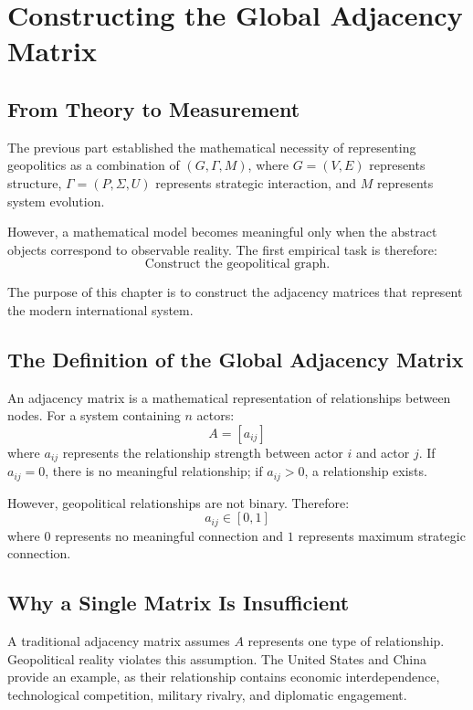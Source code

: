 \documentclass[11pt,openany]{book}
\theoremstyle{plain}
\theoremstyle{definition}
\begin{document}
\chapter{Constructing the Global Adjacency Matrix}

\section*{From Theory to Measurement}

The previous part established the mathematical necessity of representing geopolitics as a combination of \((G, \Gamma, M)\), where \(G = (V, E)\) represents structure, \(\Gamma=(P,\Sigma,U)\) represents strategic interaction, and \(M\) represents system evolution.

However, a mathematical model becomes meaningful only when the abstract objects correspond to observable reality. The first empirical task is therefore:
\[
\boxed{
\text{Construct the geopolitical graph.}
}
\]

The purpose of this chapter is to construct the adjacency matrices that represent the modern international system.

\section*{The Definition of the Global Adjacency Matrix}

An adjacency matrix is a mathematical representation of relationships between nodes. For a system containing \(n\) actors:
\[
A = [a_{ij}]
\]
where \(a_{ij}\) represents the relationship strength between actor \(i\) and actor \(j\). If \(a_{ij} = 0\), there is no meaningful relationship; if \(a_{ij} > 0\), a relationship exists.

However, geopolitical relationships are not binary. Therefore:
\[
a_{ij} \in [0, 1]
\]
where \(0\) represents no meaningful connection and \(1\) represents maximum strategic connection.

\section*{Why a Single Matrix Is Insufficient}

A traditional adjacency matrix assumes \(A\) represents one type of relationship. Geopolitical reality violates this assumption. The United States and China provide an example, as their relationship contains economic interdependence, technological competition, military rivalry, and diplomatic engagement.
\end{document}
